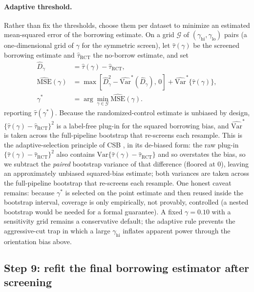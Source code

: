 \documentclass[11pt]{article}
\begin{document}
\paragraph{Adaptive threshold.} Rather than fix the thresholds, choose them per dataset to minimize an estimated mean-squared error of the borrowing estimate. On a grid $\mathcal G$ of $(\gamma_{\mathrm{hi}},\gamma_{\mathrm{lo}})$ pairs (a one-dimensional grid of $\gamma$ for the symmetric screen), let $\widehat\tau(\gamma)$ be the screened borrowing estimate and $\widehat\tau_{\mathrm{RCT}}$ the no-borrow estimate, and set
\[
\begin{aligned}
\widehat D_\gamma
&=\widehat\tau(\gamma)-\widehat\tau_{\mathrm{RCT}},\\
\widehat{\mathrm{MSE}}(\gamma)
&=\max\!\left[\widehat D_\gamma^2-
\widehat{\mathrm{Var}}^{\ast}(\widehat D_\gamma),\,0\right]
+\widehat{\mathrm{Var}}^{\ast}\!\{\widehat\tau(\gamma)\},\\
\gamma^{\ast}
&=\arg\min_{\gamma\in\mathcal G}\widehat{\mathrm{MSE}}(\gamma).
\end{aligned}
\]
reporting $\widehat\tau(\gamma^{\ast})$. Because the randomized-control estimate is unbiased by design, $\{\widehat\tau(\gamma)-\widehat\tau_{\mathrm{RCT}}\}^2$ is a label-free plug-in for the squared borrowing bias, and $\widehat{\mathrm{Var}}^{\ast}$ is taken across the full-pipeline bootstrap that re-screens each resample. This is the adaptive-selection principle of CSB \citep{zhu2025csb}, in its de-biased form: the raw plug-in $\{\widehat\tau(\gamma)-\widehat\tau_{\mathrm{RCT}}\}^2$ also contains $\mathrm{Var}\{\widehat\tau(\gamma)-\widehat\tau_{\mathrm{RCT}}\}$ and so overstates the bias, so we subtract the \emph{paired} bootstrap variance of that difference (floored at $0$), leaving an approximately unbiased squared-bias estimate; both variances are taken across the full-pipeline bootstrap that re-screens each resample. One honest caveat remains: because $\gamma^{\ast}$ is selected on the point estimate and then reused inside the bootstrap interval, coverage is only empirically, not provably, controlled (a nested bootstrap would be needed for a formal guarantee). A fixed $\gamma=0.10$ with a sensitivity grid remains a conservative default; the adaptive rule prevents the aggressive-cut trap in which a large $\gamma_{\mathrm{hi}}$ inflates apparent power through the orientation bias above.

\subsection{Step 9: refit the final borrowing estimator after screening}\label{sec:refit}
\end{document}
